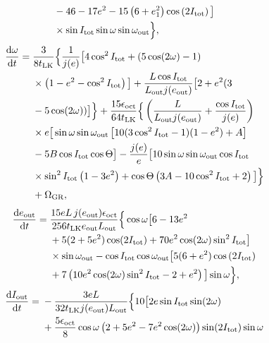 \documentclass[11pt,
        usenames, %
        dvipsnames %
    ]{article}
\newcommand*{\rd}[2]{\frac{\mathrm{d}#1}{\mathrm{d}#2}}
\newcommand*{\p}[1]{\left(#1\right)}
\newcommand*{\s}[1]{\left[#1\right]}
\begin{document}
{\begin{align}
        &- 46 - 17e^2 - 15\p{6 + e_1^2}\cos\p{2I_{\rm tot}}\big]\nonumber\\
        &\times \sin I_{\rm tot} \sin \omega \sin \omega_{\rm out}\Big\},
\end{align}
\begin{align}
    \rd{\omega}{t} ={}& \frac{3}{8t_{\rm LK}}
            \Big\{\frac{1}{j(e)} \big[4 \cos^2 I_{\rm tot}
            + \p{5 \cos (2\omega) - 1}\nonumber\\
        &\times \p{1 - e^2 - \cos^2 I_{\rm tot}}\big] + \frac{L \cos I_{\rm tot}}{
            L_{\rm out}j(e_{\rm out})}\big[2 + e^2(3\nonumber\\
        &- 5\cos(2\omega))\big]\Big\}
        + \frac{15 \epsilon_{\rm oct}}{64t_{\rm LK}}\Big\{
            \p{\frac{L}{L_{\rm out}j(e_{\rm out})}
                + \frac{\cos I_{\rm tot}}{j(e)}}\nonumber\\
        &\times e\big[\sin \omega \sin \omega_{\rm out}
            \s{10(3\cos^2 I_{\rm tot} - 1)(1 - e^2) + A}\nonumber\\
        &- 5B\cos I_{\rm tot}\cos \Theta\big] - \frac{j(e)}{e}
            \big[10 \sin \omega \sin \omega_{\rm out}\cos I_{\rm tot}\nonumber\\
        &\times \sin^2 I_{\rm tot}\p{1 - 3e^2} + \cos \Theta\p{3A -
            10\cos^2 I_{\rm tot} + 2}\big]\Big\}\nonumber\\
        &+ \Omega_{\rm GR},
\end{align}
\begin{align}
    \rd{e_{\rm out}}{t} ={}& \frac{15eL\,j(e_{\rm out})\epsilon_{\rm oct}}{
            256t_{\rm LK}e_{\rm out}L_{\rm out}}\Big\{ \cos \omega
                \big[6 - 13e^2\nonumber\\
        &+ 5(2 + 5e^2)\cos (2I_{\rm tot}) + 70e^2 \cos (2\omega) \sin^2 I_{\rm
            tot}\big]\nonumber\\
        &\times \sin \omega_{\rm out} - \cos I_{\rm tot} \cos \omega_{\rm out}
            \big[5(6 + e^2)\cos \p{2I_{\rm tot}}\nonumber\\
        &+ 7\p{10e^2 \cos (2\omega) \sin^2 I_{\rm tot} - 2 + e^2}\big]
            \sin \omega\Big\},
\end{align}
\begin{align}
    \rd{I_{\rm out}}{t} ={}& -\frac{3eL}{32t_{\rm LK}j(e_{\rm out}) L_{\rm out}}
            \Big\{ 10\big[2e \sin I_{\rm tot} \sin (2\omega)\nonumber\\
        &+ \frac{5\epsilon_{\rm oct}}{8}\cos \omega\p{
            2 + 5e^2 - 7e^2\cos (2\omega)}\sin (2I_{\rm tot})\sin \omega_{\rm
}
\end{align}}
\end{document}

